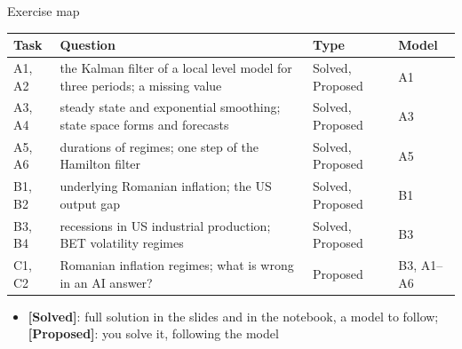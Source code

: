 \begin{frame}{Exercise map}
\itemsize{\small}
\begin{center}
\footnotesize
\begin{tabular}{>{\raggedright\arraybackslash}p{1.1cm}>{\raggedright\arraybackslash}p{7.5cm}>{\raggedright\arraybackslash}p{1.9cm}>{\raggedright\arraybackslash}p{1.4cm}}
\toprule
\textbf{Task} & \textbf{Question} & \textbf{Type} & \textbf{Model} \\
\midrule
A1, A2 & the Kalman filter of a local level model for three periods; a missing value & Solved, Proposed & A1 \\
A3, A4 & steady state and exponential smoothing; state space forms and forecasts & Solved, Proposed & A3 \\
A5, A6 & durations of regimes; one step of the Hamilton filter & Solved, Proposed & A5 \\
B1, B2 & underlying Romanian inflation; the US output gap & Solved, Proposed & B1 \\
B3, B4 & recessions in US industrial production; BET volatility regimes & Solved, Proposed & B3 \\
C1, C2 & Romanian inflation regimes; what is wrong in an AI answer? & Proposed & B3, A1--A6 \\
\bottomrule
\end{tabular}
\end{center}
\begin{itemize}
    \item \textbf{[Solved]}: full solution in the slides and in the notebook, a model to follow; \textbf{[Proposed]}: you solve it, following the model
\end{itemize}
\end{frame}

